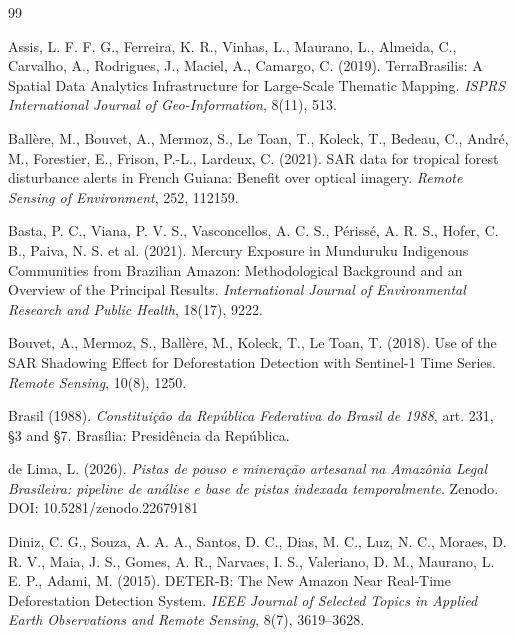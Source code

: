 \documentclass[11pt]{article}
\begin{document}

\begin{thebibliography}{99}

Assis, L. F. F. G., Ferreira, K. R., Vinhas, L., Maurano, L., Almeida, C., Carvalho, A., Rodrigues, J., Maciel, A., Camargo, C. (2019).
TerraBrasilis: A Spatial Data Analytics Infrastructure for Large-Scale Thematic Mapping.
\textit{ISPRS International Journal of Geo-Information}, 8(11), 513.

Ball\`ere, M., Bouvet, A., Mermoz, S., Le Toan, T., Koleck, T., Bedeau, C., Andr\'e, M., Forestier, E., Frison, P.-L., Lardeux, C. (2021).
SAR data for tropical forest disturbance alerts in French Guiana: Benefit over optical imagery.
\textit{Remote Sensing of Environment}, 252, 112159.

Basta, P. C., Viana, P. V. S., Vasconcellos, A. C. S., P\'eriss\'e, A. R. S., Hofer, C. B., Paiva, N. S. et al. (2021).
Mercury Exposure in Munduruku Indigenous Communities from Brazilian Amazon: Methodological Background and an Overview of the Principal Results.
\textit{International Journal of Environmental Research and Public Health}, 18(17), 9222.

Bouvet, A., Mermoz, S., Ball\`ere, M., Koleck, T., Le Toan, T. (2018).
Use of the SAR Shadowing Effect for Deforestation Detection with Sentinel-1 Time Series.
\textit{Remote Sensing}, 10(8), 1250.

Brasil (1988).
\textit{Constitui\c{c}\~ao da Rep\'ublica Federativa do Brasil de 1988}, art. 231, \S3 and \S7.
Bras\'ilia: Presid\^encia da Rep\'ublica.

de Lima, L. (2026).
\textit{Pistas de pouso e minera\c{c}\~ao artesanal na Amaz\^onia Legal Brasileira: pipeline de an\'alise e base de pistas indexada temporalmente}. Zenodo.
DOI: 10.5281/zenodo.22679181

Diniz, C. G., Souza, A. A. A., Santos, D. C., Dias, M. C., Luz, N. C., Moraes, D. R. V., Maia, J. S., Gomes, A. R., Narvaes, I. S., Valeriano, D. M., Maurano, L. E. P., Adami, M. (2015).
DETER-B: The New Amazon Near Real-Time Deforestation Detection System.
\textit{IEEE Journal of Selected Topics in Applied Earth Observations and Remote Sensing}, 8(7), 3619--3628.


\end{thebibliography}
\end{document}
